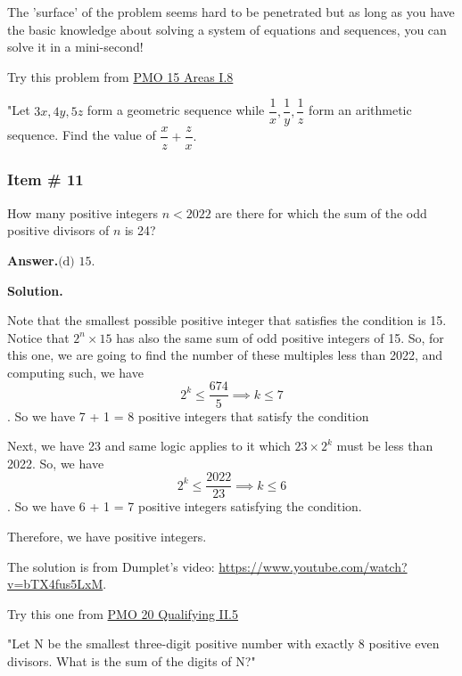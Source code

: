 \documentclass[11pt,paper=letter]{scrartcl}
\newcommand{\ans}[1]{{\sffamily \bfseries Answer.}\;\(\boxed{\text{#1}}\).}
\newcommand{\sol}{{\sffamily \bfseries Solution.}\;}
\newenvironment{rem}%
{\noindent \ignorespaces \small \sffamily  \sansmath {\bfseries \color{DarkMidnightBlue} Remark.}}%
{\ignorespacesafterend}
\begin{document}
\begin{mdframed}

\begin{rem}
The 'surface' of the problem seems hard to be penetrated but as long as you have the basic knowledge about solving a system of equations and sequences, you can solve it in a mini-second!
\end{rem}


\begin{rem}
Try this problem from \href{http://pmo.ph/wp-content/uploads/2020/12/15th-PMO-Qualifying-Area-Stage.pdf}{PMO 15 Areas I.8}

"Let $3x, 4y, 5z$ form a geometric sequence while $\dfrac{1}{x},\dfrac{1}{y}, \dfrac{1}{z} $ form an arithmetic
sequence. Find the value of $\dfrac{x}{z} + \dfrac{z}{x}.$
\end{rem}
\end{mdframed}

\subsubsection{Item \# 11}

\begin{probboxed}
\item How many positive integers $n<2022$ are there for which the sum of the odd positive divisors of $n$ is 24?

\end{probboxed}

\ans{(d) 15}

\sol

Note that the smallest possible positive integer that satisfies the condition is 15. Notice that $2^n \times 15$ has also the same sum of odd positive integers of 15. So, for this one, we are going to find the number of these multiples less than 2022, and computing such, we have $$2^k \leq \dfrac{674}{5} \implies k \leq 7$$. So we have 7 + 1 = 8 positive integers that satisfy the condition

Next, we have 23 and same logic applies to it which $23 \times 2^k$ must be less than 2022. So, we have $$2^k \leq \dfrac{2022}{23} \implies k \leq 6$$. So we have 6 + 1 = 7 positive integers satisfying the condition.

Therefore, we have  positive integers.

\begin{mdframed}
\begin{rem}
The solution is from Dumplet's video: \url{https://www.youtube.com/watch?v=bTX4fus5LxM}.
\end{rem}

\begin{rem}
Try this one from \href{http://pmo.ph/wp-content/uploads/2018/08/PMO-20-Qualifying-Round-with-answers-only.pdf}{PMO 20 Qualifying II.5}

"Let N be the smallest three-digit positive number with exactly 8 positive even divisors. What is the sum of the digits of N?"
\end{rem}
\end{mdframed}
\end{document}
